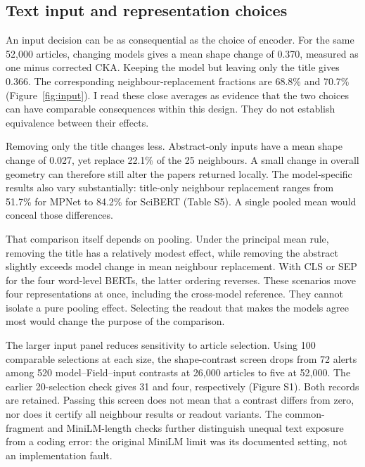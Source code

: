 \documentclass[12pt]{article}
\begin{document}
\subsection{Text input and representation choices}
An input decision can be as consequential as the choice of encoder. For the same 52,000 articles, changing models gives a mean shape change of 0.370, measured as one minus corrected CKA. Keeping the model but leaving only the title gives 0.366. The corresponding neighbour-replacement fractions are 68.8\% and 70.7\% (Figure~\ref{fig:input}). I read these close averages as evidence that the two choices can have comparable consequences within this design. They do not establish equivalence between their effects.


Removing only the title changes less. Abstract-only inputs have a mean shape change of 0.027, yet replace 22.1\% of the 25 neighbours. A small change in overall geometry can therefore still alter the papers returned locally. The model-specific results also vary substantially: title-only neighbour replacement ranges from 51.7\% for MPNet to 84.2\% for SciBERT (Table S5). A single pooled mean would conceal those differences.

That comparison itself depends on pooling. Under the principal mean rule, removing the title has a relatively modest effect, while removing the abstract slightly exceeds model change in mean neighbour replacement. With CLS or SEP for the four word-level BERTs, the latter ordering reverses. These scenarios move four representations at once, including the cross-model reference. They cannot isolate a pure pooling effect. Selecting the readout that makes the models agree most would change the purpose of the comparison.

The larger input panel reduces sensitivity to article selection. Using 100 comparable selections at each size, the shape-contrast screen drops from 72 alerts among 520 model--Field--input contrasts at 26,000 articles to five at 52,000. The earlier 20-selection check gives 31 and four, respectively (Figure S1). Both records are retained. Passing this screen does not mean that a contrast differs from zero, nor does it certify all neighbour results or readout variants. The common-fragment and MiniLM-length checks further distinguish unequal text exposure from a coding error: the original MiniLM limit was its documented setting, not an implementation fault.
\end{document}

